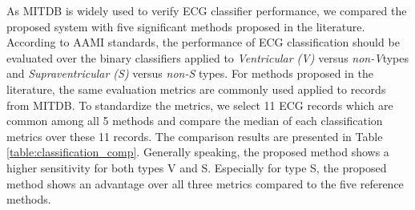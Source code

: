 \begin{table}[b]
\centering
\caption{Classification Performance and Within-Set Variation of Proposed System}
\label{table:variation}
\end{table}

As MITDB is widely used to verify ECG classifier performance, we compared the proposed system with five significant methods proposed in the literature. According to AAMI standards, the performance of ECG classification should be evaluated over the binary classifiers applied to \textit{Ventricular (V)} versus \textit{non-V}types and \textit{Supraventricular (S)} versus \textit{non-S} types. For methods proposed in the literature, the same evaluation metrics are commonly used applied to records from MITDB. To standardize the metrics, we select 11 ECG records which are common among all 5 methods and compare the median of each classification metrics over these 11 records. The comparison results are presented in Table \ref{table:classification_comp}. Generally speaking, the proposed method shows a higher sensitivity for both types V and S. Especially for type S, the proposed method shows an advantage over all three metrics compared to the five reference methods.


